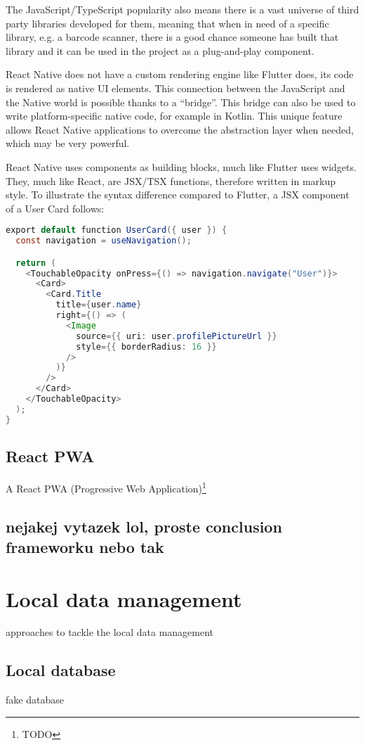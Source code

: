 \documentclass[
  digital,     %
  color,       %
  oneside,     %
  nosansbold,  %
  nocolorbold, %
  lof,         %
  lot,         %
]{fithesis4}
\begin{document}
The JavaScript/TypeScript popularity also means there is a vast universe of third party libraries developed for them, meaning that when in need of a specific library, e.g. a barcode scanner, there is a good chance someone has built that library and it can be used in the project as a plug-and-play component.

React Native does not have a custom rendering engine like Flutter does, its code is rendered as native UI elements. This connection between the JavaScript and the Native world is possible thanks to a ``bridge''\cite{ReactNative}. This bridge can also be used to write platform-specific native code, for example in Kotlin. This unique feature allows React Native applications to overcome the abstraction layer when needed, which may be very powerful.

React Native uses components as building blocks, much like Flutter uses widgets. They, much like React, are JSX/TSX functions, therefore written in markup style. To illustrate the syntax difference compared to Flutter, a JSX component of a User Card follows:

\begin{lstlisting}[language=java, caption={React Native example --- User Card}]
export default function UserCard({ user }) {
  const navigation = useNavigation();

  return (
    <TouchableOpacity onPress={() => navigation.navigate("User")}>
      <Card>
        <Card.Title
          title={user.name}
          right={() => (
            <Image
              source={{ uri: user.profilePictureUrl }}
              style={{ borderRadius: 16 }}
            />
          )}
        />
      </Card>
    </TouchableOpacity>
  );
}
\end{lstlisting}

\subsection{React PWA}
A React PWA (Progressive Web Application)\footnote{TODO} 
\subsection{nejakej vytazek lol, proste conclusion frameworku nebo tak}
\section{Local data management}
approaches to tackle the local data management
\subsection{Local database}
fake database
\end{document}
